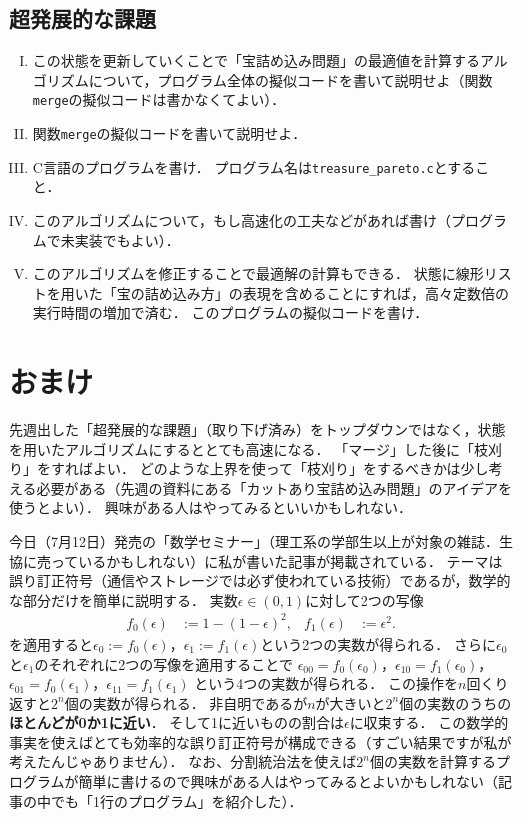 \documentclass[a4paper,twoside,onecolumn,openany,article]{memoir}
\theoremstyle{remark}
\begin{document}
\subsection{超発展的な課題}
\begin{enumerate}[I.]
\item この状態を更新していくことで「宝詰め込み問題」の最適値を計算するアルゴリズムについて，プログラム全体の擬似コードを書いて説明せよ（関数\texttt{merge}の擬似コードは書かなくてよい）．
\item 関数\texttt{merge}の擬似コードを書いて説明せよ．
\item C言語のプログラムを書け．
プログラム名は\texttt{treasure\_pareto.c}とすること．
\item このアルゴリズムについて，もし高速化の工夫などがあれば書け（プログラムで未実装でもよい）．
\item このアルゴリズムを修正することで最適解の計算もできる．
状態に線形リストを用いた「宝の詰め込み方」の表現を含めることにすれば，高々定数倍の実行時間の増加で済む．
このプログラムの擬似コードを書け．
\end{enumerate}


\section{おまけ}
先週出した「超発展的な課題」（取り下げ済み）をトップダウンではなく，状態を用いたアルゴリズムにするととても高速になる．
「マージ」した後に「枝刈り」をすればよい．
どのような上界を使って「枝刈り」をするべきかは少し考える必要がある（先週の資料にある「カットあり宝詰め込み問題」のアイデアを使うとよい）．
興味がある人はやってみるといいかもしれない．

今日（7月12日）発売の「数学セミナー」（理工系の学部生以上が対象の雑誌．生協に売っているかもしれない）に私が書いた記事が掲載されている．
テーマは誤り訂正符号（通信やストレージでは必ず使われている技術）であるが，数学的な部分だけを簡単に説明する．
実数$\epsilon\in(0,1)$に対して2つの写像
\begin{align*}
f_0(\epsilon) &:=1-(1-\epsilon)^2,&
f_1(\epsilon) &:=\epsilon^2.
\end{align*}
を適用すると$\epsilon_0 := f_0(\epsilon)$，$\epsilon_1 := f_1(\epsilon)$という2つの実数が得られる．
さらに$\epsilon_0$と$\epsilon_1$のそれぞれに2つの写像を適用することで
$\epsilon_{00} = f_0(\epsilon_0)$，$\epsilon_{10}=f_1(\epsilon_0)$， $\epsilon_{01}=f_0(\epsilon_1)$，$\epsilon_{11}=f_1(\epsilon_1)$
という4つの実数が得られる．
この操作を$n$回くり返すと$2^n$個の実数が得られる．
非自明であるが$n$が大きいと$2^n$個の実数のうちの\textbf{ほとんどが0か1に近い}．
そして1に近いものの割合は$\epsilon$に収束する．
この数学的事実を使えばとても効率的な誤り訂正符号が構成できる（すごい結果ですが私が考えたんじゃありません）．
なお、分割統治法を使えば$2^n$個の実数を計算するプログラムが簡単に書けるので興味がある人はやってみるとよいかもしれない（記事の中でも「1行のプログラム」を紹介した）．
\end{document}
